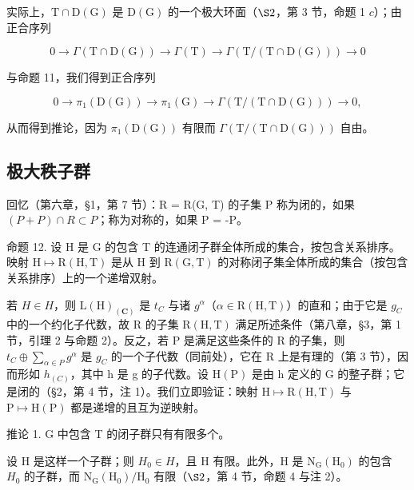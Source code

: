 实际上，\(\mathrm{T} \cap \mathrm{D}(\mathrm{G})\) 是 \(\mathrm{D}(\mathrm{G})\) 的一个极大环面（\(\S 2\)，第 3 节，命题 1 \(c\)）；由正合序列

\[
0 \longrightarrow \Gamma (\mathrm{T} \cap \mathrm{D} (\mathrm{G})) \longrightarrow \Gamma (\mathrm{T}) \longrightarrow \Gamma (\mathrm{T} / (\mathrm{T} \cap \mathrm{D} (\mathrm{G}))) \longrightarrow 0
\]

与命题 11，我们得到正合序列

\[
0 \longrightarrow \pi_ {1} (\mathrm{D} (\mathrm{G})) \longrightarrow \pi_ {1} (\mathrm{G}) \longrightarrow \Gamma (\mathrm{T} / (\mathrm{T} \cap \mathrm{D} (\mathrm{G}))) \longrightarrow 0,
\]

从而得到推论，因为 \(\pi_{1}(\mathrm{D}(\mathrm{G}))\) 有限而 \(\Gamma(\mathrm{T}/(\mathrm{T}\cap\mathrm{D}(\mathrm{G})))\) 自由。

\subsection{极大秩子群}

回忆（第六章，§1，第 7 节）：R = R(G, T) 的子集 P 称为闭的，如果 \((P + P) \cap R \subset P\)；称为对称的，如果 P = -P。

命题 12. 设 H 是 G 的包含 T 的连通闭子群全体所成的集合，按包含关系排序。映射 \(\mathrm{H} \mapsto \mathrm{R}(\mathrm{H}, \mathrm{T})\) 是从 H 到 \(\mathrm{R}(\mathrm{G}, \mathrm{T})\) 的对称闭子集全体所成的集合（按包含关系排序）上的一个递增双射。

若 \(H \in H\)，则 \(\mathrm{L}(\mathrm{H})_{(\mathbf{C})}\) 是 \(t_{C}\) 与诸 \(g^{\alpha}\)（\(\alpha \in \mathrm{R}(\mathrm{H}, \mathrm{T})\)）的直和；由于它是 \(g_{C}\) 中的一个约化子代数，故 R 的子集 \(\mathrm{R}(\mathrm{H}, \mathrm{T})\) 满足所述条件（第八章，§3，第 1 节，引理 2 与命题 2）。反之，若 P 是满足这些条件的 R 的子集，则 \(t_{C} \oplus \sum_{\alpha \in P} g^{\alpha}\) 是 \(g_{C}\) 的一个子代数（同前处），它在 R 上是有理的（第 3 节），因而形如 \(h_{(C)}\)，其中 h 是 g 的子代数。设 \(\mathrm{H}(\mathrm{P})\) 是由 h 定义的 G 的整子群；它是闭的（§2，第 4 节，注 1）。我们立即验证：映射 \(\mathrm{H} \mapsto \mathrm{R}(\mathrm{H}, \mathrm{T})\) 与 \(\mathrm{P} \mapsto \mathrm{H}(\mathrm{P})\) 都是递增的且互为逆映射。

推论 1. G 中包含 T 的闭子群只有有限多个。

设 H 是这样一个子群；则 \(H_{0} \in H\)，且 H 有限。此外，H 是 \(\mathrm{N}_{\mathrm{G}}(\mathrm{H}_{0})\) 的包含 \(H_{0}\) 的子群，而 \(\mathrm{N}_{\mathrm{G}}(\mathrm{H}_{0})/\mathrm{H}_{0}\) 有限（\(\S2\)，第 4 节，命题 4 与注 2）。

